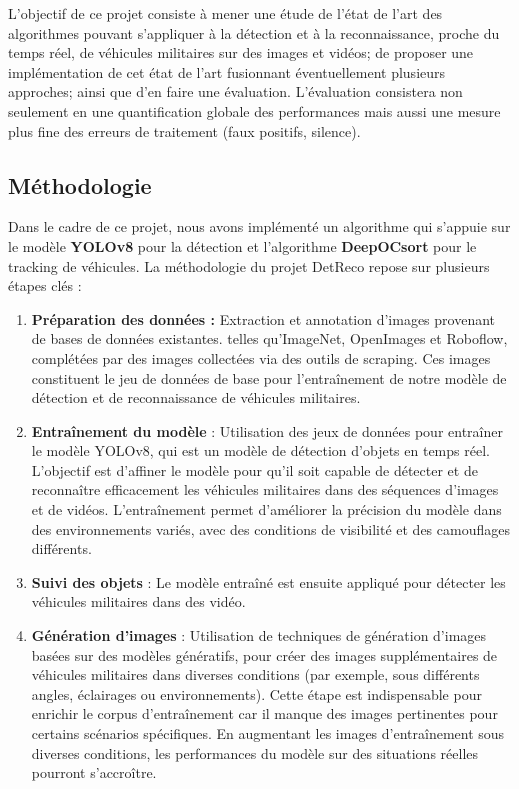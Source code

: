 L'objectif de ce projet consiste à mener une étude de l’état de l’art des algorithmes pouvant s’appliquer à la détection et à la reconnaissance, proche du temps réel, de véhicules militaires sur des images et vidéos; de proposer une implémentation de cet état de l’art fusionnant éventuellement plusieurs approches; ainsi que d’en faire une évaluation.
L’évaluation consistera non seulement en une quantification globale des performances mais aussi une mesure plus fine des erreurs de traitement (faux positifs, silence).


\subsection{Méthodologie}

Dans le cadre de ce projet, nous avons implémenté un algorithme qui s’appuie sur le modèle \textbf{YOLOv8} pour la détection et l’algorithme \textbf{DeepOCsort} pour le tracking de véhicules.
La méthodologie du projet DetReco repose sur plusieurs étapes clés :
\begin{enumerate}
	\item \textbf{Préparation des données :} Extraction et annotation d'images provenant de bases de données existantes. telles qu'ImageNet, OpenImages et Roboflow, complétées par des images collectées via des outils de scraping.
	      Ces images constituent le jeu de données de base pour l’entraînement de notre modèle de détection et de reconnaissance de véhicules militaires.

	\item \textbf{Entraînement du modèle} : Utilisation des jeux de données pour entraîner le modèle YOLOv8, qui est un modèle de détection d'objets en temps réel.
	      L'objectif est d'affiner le modèle pour qu'il soit capable de détecter et de reconnaître efficacement les véhicules militaires dans des séquences d’images et de vidéos.
	      L'entraînement permet d'améliorer la précision du modèle dans des environnements variés, avec des conditions de visibilité et des camouflages différents.

	\item \textbf{Suivi des objets} : Le modèle entraîné est ensuite appliqué pour détecter les véhicules militaires dans des vidéo.

	\item \textbf{Génération d’images} : Utilisation de techniques de génération d'images basées sur des modèles génératifs, pour créer des images supplémentaires de véhicules militaires dans diverses conditions (par exemple, sous différents angles, éclairages ou environnements).
	      Cette étape est indispensable pour enrichir le corpus d’entraînement car il manque des images pertinentes pour certains scénarios spécifiques.
	      En augmentant les images d'entraînement sous diverses conditions, les performances du modèle sur des situations réelles pourront s'accroître.

\end{enumerate}

